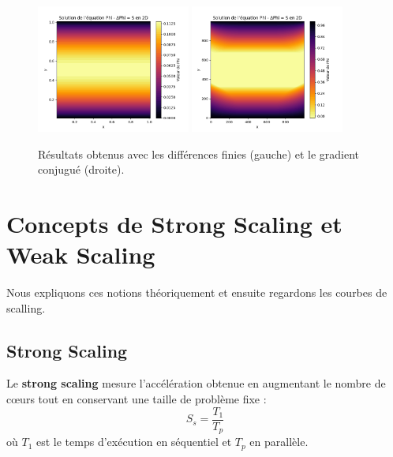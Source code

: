 \documentclass[a4paper,12pt]{article}
\begin{document}
\begin{figure}[h]
    \centering
    \includegraphics[width=0.45\textwidth]{1.png}
    \includegraphics[width=0.45\textwidth]{2.png}
    \caption{Résultats obtenus avec les différences finies (gauche) et le gradient conjugué (droite).}
    \label{fig:validation}
\end{figure}

\newpage
\section{Concepts de Strong Scaling et Weak Scaling}
Nous expliquons ces notions théoriquement et ensuite regardons les courbes de scalling.

\subsection{Strong Scaling}
Le \textbf{strong scaling} mesure l’accélération obtenue en augmentant le nombre de cœurs tout en conservant une taille de problème fixe :
\begin{equation}
S_s = \frac{T_1}{T_p}
\end{equation}
où $T_1$ est le temps d’exécution en séquentiel et $T_p$ en parallèle.
\end{document}
